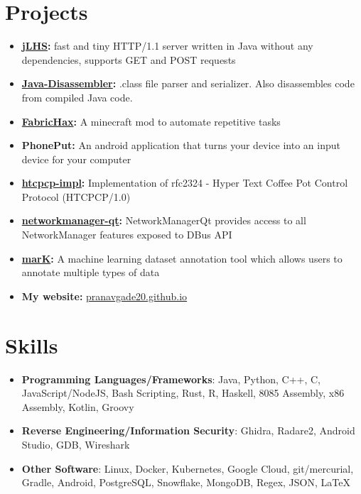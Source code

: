 \documentclass[letterpaper,11pt]{article}
\newcommand{\orignalResumeItem}[2]{
  \item\small{
    \textbf{#1}{ #2 \vspace{-2pt}}
  }
}
\newcommand{\resumeSubItem}[2]{\orignalResumeItem{#1}{#2}\vspace{-4pt}}
\newcommand{\resumeSubHeadingListStart}{\begin{itemize}[leftmargin=*]}
\newcommand{\resumeSubHeadingListEnd}{\end{itemize}}
\begin{document}
\section{Projects}
  \resumeSubHeadingListStart
    \resumeSubItem{\href{https://github.com/pranavgade20/jLHS}{jLHS}:}
      {\vspace{-2pt} fast and tiny HTTP/1.1 server written in Java without any dependencies, supports GET and POST requests}
    \resumeSubItem{\href{https://github.com/pranavgade20/ClassReader}{Java-Disassembler}:}
      {\vspace{-2pt} .class file parser and serializer. Also disassembles code from compiled Java code.}
    \resumeSubItem{\href{https://github.com/pranavgade20/FabricHax}{FabricHax}:}
	  {\vspace{-2pt}  A minecraft mod to automate repetitive tasks}
    \resumeSubItem{PhonePut:}
      {\vspace{-2pt} An android application that turns your device into an input device for your computer}
    \resumeSubItem{\href{https://github.com/pranavgade20/htcpcp-impl}{htcpcp-impl}:}
      {\vspace{-2pt} Implementation of rfc2324 - Hyper Text Coffee Pot Control Protocol (HTCPCP/1.0)}
    \resumeSubItem{\href{https://phabricator.kde.org/source/networkmanager-qt/}{networkmanager-qt}:}
      {\vspace{-2pt} NetworkManagerQt provides access to all NetworkManager features exposed to DBus API}
   \resumeSubItem{\href{https://invent.kde.org/education/mark}{marK}:}
      {\vspace{-2pt} A machine learning dataset annotation tool which allows users to annotate multiple types of data}
    \resumeSubItem{My website:}
      {\vspace{-2pt} \href{http://pranavgade20.github.io/}{pranavgade20.github.io}}
  \resumeSubHeadingListEnd


\section{Skills}
 \resumeSubHeadingListStart
   \item{
     \textbf{Programming Languages/Frameworks}{: Java, Python, C++, C, JavaScript/NodeJS, Bash Scripting, Rust, R, Haskell, 8085 Assembly, x86 Assembly, Kotlin, Groovy}
   }
    \item{
      \vspace{-8pt}
      \textbf{Reverse Engineering/Information Security}{: Ghidra, Radare2, Android Studio, GDB, Wireshark}
    }
    \item{
      \vspace{-8pt}
      \textbf{Other Software}{: Linux, Docker, Kubernetes, Google Cloud, git/mercurial, Gradle, Android, PostgreSQL, Snowflake, MongoDB, Regex, JSON, LaTeX}
    }

 \resumeSubHeadingListEnd
\end{document}
